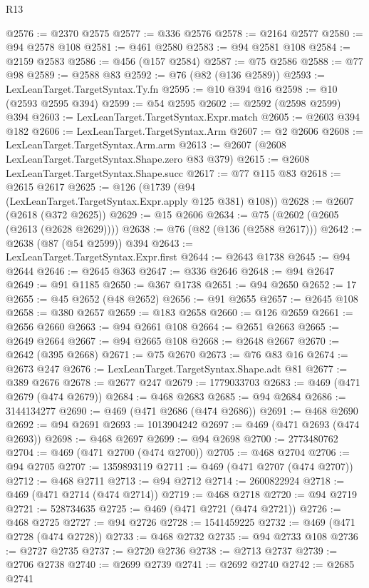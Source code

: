 \begin{lexlean}{R13}
\begin{coremodule}
@2576 := @2370 @2575
@2577 := @336 @2576
@2578 := @2164 @2577
@2580 := @94 @2578 @108
@2581 := @461 @2580
@2583 := @94 @2581 @108
@2584 := @2159 @2583
@2586 := @456 (@157 @2584)
@2587 := @75 @2586
@2588 := @77 @98
@2589 := @2588 @83
@2592 := @76 (@82 (@136 @2589))
@2593 := LexLeanTarget.TargetSyntax.Ty.fn
@2595 := @10 @394 @16
@2598 := @10 (@2593 @2595 @394)
@2599 := @54 @2595
@2602 := @2592 (@2598 @2599) @394
@2603 := LexLeanTarget.TargetSyntax.Expr.match
@2605 := @2603 @394 @182
@2606 := LexLeanTarget.TargetSyntax.Arm
@2607 := @2 @2606
@2608 := LexLeanTarget.TargetSyntax.Arm.arm
@2613 := @2607 (@2608 LexLeanTarget.TargetSyntax.Shape.zero @83 @379)
@2615 := @2608 LexLeanTarget.TargetSyntax.Shape.succ
@2617 := @77 @115 @83
@2618 := @2615 @2617
@2625 := @126 (@1739 (@94 (LexLeanTarget.TargetSyntax.Expr.apply @125 @381) @108))
@2628 := @2607 (@2618 (@372 @2625))
@2629 := @15 @2606
@2634 := @75 (@2602 (@2605 (@2613 (@2628 @2629))))
@2638 := @76 (@82 (@136 (@2588 @2617)))
@2642 := @2638 (@87 (@54 @2599)) @394
@2643 := LexLeanTarget.TargetSyntax.Expr.first
@2644 := @2643 @1738
@2645 := @94 @2644
@2646 := @2645 @363
@2647 := @336 @2646
@2648 := @94 @2647
@2649 := @91 @1185
@2650 := @367 @1738
@2651 := @94 @2650
@2652 := 17
@2655 := @45 @2652 (@48 @2652)
@2656 := @91 @2655
@2657 := @2645 @108
@2658 := @380 @2657
@2659 := @183 @2658
@2660 := @126 @2659
@2661 := @2656 @2660
@2663 := @94 @2661 @108
@2664 := @2651 @2663
@2665 := @2649 @2664
@2667 := @94 @2665 @108
@2668 := @2648 @2667
@2670 := @2642 (@395 @2668)
@2671 := @75 @2670
@2673 := @76 @83 @16
@2674 := @2673 @247
@2676 := LexLeanTarget.TargetSyntax.Shape.adt @81
@2677 := @389 @2676
@2678 := @2677 @247
@2679 := 1779033703
@2683 := @469 (@471 @2679 (@474 @2679))
@2684 := @468 @2683
@2685 := @94 @2684
@2686 := 3144134277
@2690 := @469 (@471 @2686 (@474 @2686))
@2691 := @468 @2690
@2692 := @94 @2691
@2693 := 1013904242
@2697 := @469 (@471 @2693 (@474 @2693))
@2698 := @468 @2697
@2699 := @94 @2698
@2700 := 2773480762
@2704 := @469 (@471 @2700 (@474 @2700))
@2705 := @468 @2704
@2706 := @94 @2705
@2707 := 1359893119
@2711 := @469 (@471 @2707 (@474 @2707))
@2712 := @468 @2711
@2713 := @94 @2712
@2714 := 2600822924
@2718 := @469 (@471 @2714 (@474 @2714))
@2719 := @468 @2718
@2720 := @94 @2719
@2721 := 528734635
@2725 := @469 (@471 @2721 (@474 @2721))
@2726 := @468 @2725
@2727 := @94 @2726
@2728 := 1541459225
@2732 := @469 (@471 @2728 (@474 @2728))
@2733 := @468 @2732
@2735 := @94 @2733 @108
@2736 := @2727 @2735
@2737 := @2720 @2736
@2738 := @2713 @2737
@2739 := @2706 @2738
@2740 := @2699 @2739
@2741 := @2692 @2740
@2742 := @2685 @2741

\end{coremodule}
\end{lexlean}
